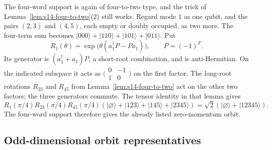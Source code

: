 \documentclass{article}
\theoremstyle{definition}
\theoremstyle{remark}
\newcommand{\ket}[1]{\lvert #1\rangle}
\begin{document}
The four-word support is again of four-to-two type, and the trick of
Lemma~\ref{lem:s14-four-to-two}(2) still works. Regard mode $1$ as one qubit,
and the pairs $(2,3)$ and $(4,5)$, each empty or doubly occupied, as two more. The four-term sum becomes
$\ket{000}+\ket{110}+\ket{101}+\ket{011}$. Put
\[
 R_1(\theta)=\exp\!\bigl(\theta(a_1^\dagger P-Pa_1)\bigr),
 \qquad P=(-1)^F.
\]
Its generator is $(a_1^\dagger+a_1)P$, a short-root combination,
and is anti-Hermitian. On the indicated subspace it acts as
$\bigl(\begin{smallmatrix}0&-1\\1&0\end{smallmatrix}\bigr)$ on the
first factor. The long-root rotations $R_{23}$ and $R_{45}$ from
Lemma~\ref{lem:s14-four-to-two} act on the other two factors; the three
generators commute. The tensor identity in that lemma gives
\begin{equation}
 R_1(\pi/4)R_{23}(\pi/4)R_{45}(\pi/4)
 (\ket\varnothing+\ket{123}+\ket{145}+\ket{2345})
 =\sqrt2(\ket\varnothing+\ket{12345}).
 \label{eq:B5-four-to-two}
\end{equation}
The four-word support therefore gives the already listed zero-momentum
orbit.

\subsection{Odd-dimensional orbit representatives}
\label{sec:odd-summary}
\end{document}
